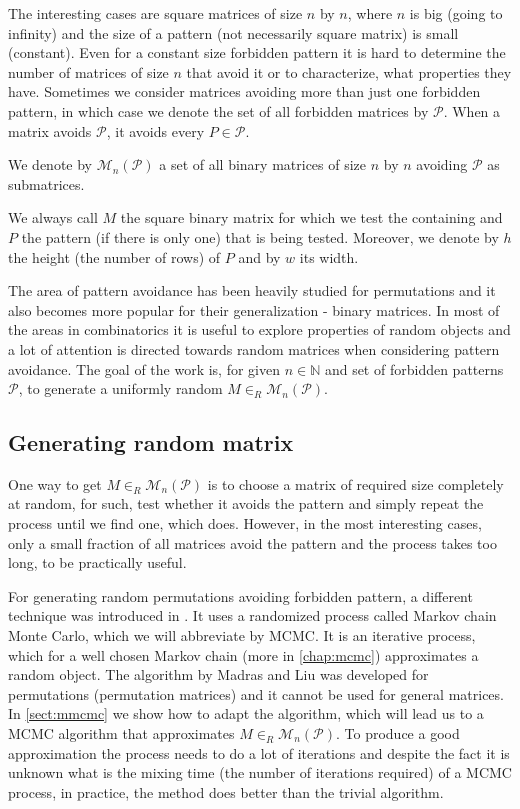 The interesting cases are square matrices of size $n$ by $n$, where $n$ is big (going to infinity) and the size of a pattern (not necessarily square matrix) is small (constant). Even for a constant size forbidden pattern it is hard to determine the number of matrices of size $n$ that avoid it or to characterize, what properties they have. Sometimes we consider matrices avoiding more than just one forbidden pattern, in which case we denote the set of all forbidden matrices by $\mathcal{P}$. When a matrix avoids $\mathcal{P}$, it avoids every $P\in\mathcal{P}$. 
\begin{defn}
We denote by $\mathcal{M}_n(\mathcal{P})$ a set of all binary matrices of size $n$ by $n$ avoiding $\mathcal{P}$ as submatrices.
\end{defn}
\begin{defn}
We always call $M$ the square binary matrix for which we test the containing and $P$ the pattern (if there is only one) that is being tested. Moreover, we denote by $h$ the height (the number of rows) of $P$ and by $w$ its width.
\end{defn}
The area of pattern avoidance has been heavily studied for permutations and it also becomes more popular for their generalization - binary matrices. In most of the areas in combinatorics it is useful to explore properties of random objects and a lot of attention is directed towards random matrices when considering pattern avoidance. The goal of the work is, for given $n\in\mathbb{N}$ and set of forbidden patterns $\mathcal{P}$, to generate a uniformly random $M\in_R\mathcal{M}_n(\mathcal{P})$.
\subsection*{Generating random matrix}
One way to get $M\in_R\mathcal{M}_n(\mathcal{P})$ is to choose a matrix of required size completely at random, for such, test whether it avoids the pattern and simply repeat the process until we find one, which does. However, in the most interesting cases, only a small fraction of all matrices avoid the pattern and the process takes too long, to be practically useful.

For generating random permutations avoiding forbidden pattern, a different technique was introduced in \cite{MadrasLiu-mcmc}. It uses a randomized process called Markov chain Monte Carlo, which we will abbreviate by MCMC. It is an iterative process, which for a well chosen Markov chain (more in \autoref{chap:mcmc}) approximates a random object. The algorithm by Madras and Liu was developed for permutations (permutation matrices) and it cannot be used for general matrices. In \autoref{sect:mmcmc} we show how to adapt the algorithm, which will lead us to a MCMC algorithm that approximates $M\in_R\mathcal{M}_n(\mathcal{P})$. To produce a good approximation the process needs to do a lot of iterations and despite the fact it is unknown what is the mixing time (the number of iterations required) of a MCMC process, in practice, the method does better than the trivial algorithm.
